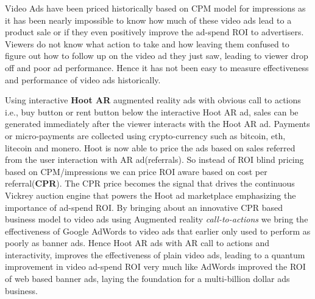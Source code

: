 Video Ads have been priced historically based on CPM model for impressions as it has been nearly impossible to know how much of these video ads lead to a product sale or if they even positively improve the ad-spend ROI to advertisers. Viewers do not know what action to take and how leaving them confused to figure out how to follow up on the video ad they just saw, leading to viewer drop off and poor ad performance. Hence it has not been easy  to measure effectiveness and performance of video ads historically.

Using interactive \textbf{Hoot AR} augmented reality  ads with obvious
call to actions i.e., buy button or rent button below the
interactive Hoot AR ad, sales can be generated immediately
after the viewer interacts with the Hoot AR ad. Payments or micro-payments are collected using crypto-currency such as bitcoin, eth, litecoin and monero. Hoot is now able to
price the ads based on sales referred from the user interaction with AR ad(referrals). So instead of ROI blind pricing based on CPM/impressions we can
price ROI aware based on  cost per referral(\textbf{CPR}). The CPR price becomes
the signal that drives the continuous Vickrey auction engine that powers the
Hoot ad marketplace emphasizing the importance of ad-spend ROI. By bringing about an innovative CPR based
business model to video ads using Augmented reality
\emph{call-to-actions} we bring the effectiveness of Google AdWords to
video ads that earlier only used to perform as poorly as banner ads. Hence Hoot AR ads with AR call to actions and interactivity, improves the effectiveness of plain video
ads, leading to a quantum improvement in video ad-spend ROI very much like
AdWords improved the ROI of web based banner ads, laying the
foundation for a multi-billion dollar ads business.
